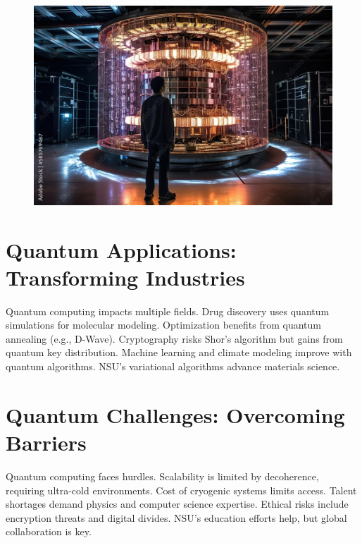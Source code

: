 \documentclass[a4paper,10pt,twocolumn]{memoir}
\begin{document}
\begin{figure}[ht]
  \centering
  \includegraphics[width=\columnwidth]{QC-3.jpeg}
  \caption*{}
  \label{fig3}
\end{figure}


\section*{Quantum Applications: Transforming Industries}
Quantum computing impacts multiple fields. Drug discovery uses quantum simulations for molecular modeling. Optimization benefits from quantum annealing (e.g., D-Wave). Cryptography risks Shor's algorithm but gains from quantum key distribution. Machine learning and climate modeling improve with quantum algorithms. NSU's variational algorithms advance materials science.


\section*{Quantum Challenges: Overcoming Barriers}
Quantum computing faces hurdles. Scalability is limited by decoherence, requiring ultra-cold environments. Cost of cryogenic systems limits access. Talent shortages demand physics and computer science expertise. Ethical risks include encryption threats and digital divides. NSU's education efforts help, but global collaboration is key.
\end{document}
